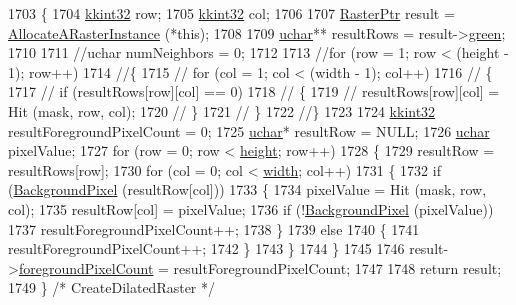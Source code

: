 \begin{DoxyCode}
1703 \{
1704   \hyperlink{namespace_k_k_b_a8fa4952cc84fda1de4bec1fbdd8d5b1b}{kkint32} row;
1705   \hyperlink{namespace_k_k_b_a8fa4952cc84fda1de4bec1fbdd8d5b1b}{kkint32} col;
1706 
1707   \hyperlink{class_k_k_b_1_1_raster}{RasterPtr}  result = \hyperlink{class_k_k_b_1_1_raster_aa879980d112c01cb7ad9a3cfc7cd6f64}{AllocateARasterInstance} (*\textcolor{keyword}{this});
1708 
1709   \hyperlink{namespace_k_k_b_ace9969169bf514f9ee6185186949cdf7}{uchar}** resultRows = result->\hyperlink{class_k_k_b_1_1_raster_a2d2238911145488e226cd2e34fc8448c}{green};
1710 
1711   \textcolor{comment}{//uchar  numNeighbors = 0;}
1712 
1713   \textcolor{comment}{//for  (row = 1; row < (height - 1); row++)}
1714   \textcolor{comment}{//\{}
1715   \textcolor{comment}{//  for  (col = 1; col < (width - 1); col++)}
1716   \textcolor{comment}{//  \{}
1717   \textcolor{comment}{//    if  (resultRows[row][col] == 0)}
1718   \textcolor{comment}{//    \{}
1719   \textcolor{comment}{//      resultRows[row][col] = Hit (mask, row, col);}
1720   \textcolor{comment}{//    \}}
1721   \textcolor{comment}{//  \}}
1722   \textcolor{comment}{//\}}
1723 
1724   \hyperlink{namespace_k_k_b_a8fa4952cc84fda1de4bec1fbdd8d5b1b}{kkint32}  resultForegroundPixelCount = 0;
1725   \hyperlink{namespace_k_k_b_ace9969169bf514f9ee6185186949cdf7}{uchar}*  resultRow = NULL;
1726   \hyperlink{namespace_k_k_b_ace9969169bf514f9ee6185186949cdf7}{uchar}   pixelValue;
1727   \textcolor{keywordflow}{for}  (row = 0; row < \hyperlink{class_k_k_b_1_1_raster_af39ff189de4fbb6de98392e187efafb7}{height}; row++)
1728   \{
1729     resultRow = resultRows[row];
1730     \textcolor{keywordflow}{for}  (col = 0; col < \hyperlink{class_k_k_b_1_1_raster_ae0bcc103e191c3421d7692dc69ceb554}{width}; col++)
1731     \{
1732       \textcolor{keywordflow}{if}  (\hyperlink{class_k_k_b_1_1_raster_a0756fb5530274d5e28858d3e1633d595}{BackgroundPixel} (resultRow[col]))
1733       \{
1734         pixelValue = Hit (mask, row, col);
1735         resultRow[col] = pixelValue;
1736         \textcolor{keywordflow}{if}  (!\hyperlink{class_k_k_b_1_1_raster_a0756fb5530274d5e28858d3e1633d595}{BackgroundPixel} (pixelValue))
1737           resultForegroundPixelCount++;
1738       \}
1739       \textcolor{keywordflow}{else}
1740       \{
1741         resultForegroundPixelCount++;
1742       \}
1743     \}
1744   \}
1745 
1746   result->\hyperlink{class_k_k_b_1_1_raster_aa7e86253f4b9c347da718732e44b60e8}{foregroundPixelCount} = resultForegroundPixelCount;
1747 
1748   \textcolor{keywordflow}{return}  result;
1749 \}  \textcolor{comment}{/* CreateDilatedRaster */}
\end{DoxyCode}
